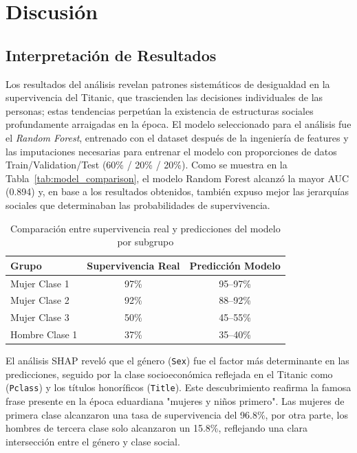 \documentclass[conference]{IEEEtran}
\begin{document}
\section{Discusión}

\subsection{Interpretación de Resultados}

Los resultados del análisis revelan patrones sistemáticos de desigualdad en la supervivencia del Titanic, que trascienden las decisiones individuales de las personas; estas tendencias perpetúan la existencia de estructuras sociales profundamente arraigadas en la época.\cite{hall1986social} El modelo seleccionado para el análisis fue el  \emph{Random Forest}, entrenado con el dataset después de la ingeniería de features y las imputaciones necesarias para entrenar el modelo con proporciones de datos Train/Validation/Test (60\% / 20\% / 20\%). Como se muestra en la Tabla~\ref{tab:model_comparison}, el modelo Random Forest alcanzó la mayor AUC (0.894) y, en base a los resultados obtenidos, también expuso mejor las jerarquías sociales que determinaban las probabilidades de supervivencia.


\begin{table}[htbp]
\centering
\caption{Comparación entre supervivencia real y predicciones del modelo por subgrupo}
\label{tab:grupo_prediccion}
\begin{tabular}{lcc}
\toprule
\textbf{Grupo} & \textbf{Supervivencia Real} & \textbf{Predicción Modelo} \\
\midrule
Mujer Clase 1   & 97\% & 95--97\% \\
Mujer Clase 2   & 92\% & 88--92\% \\
Mujer Clase 3   & 50\% & 45--55\% \\
Hombre Clase 1  & 37\% & 35--40\% \\
\bottomrule
\end{tabular}
\end{table}


El análisis SHAP reveló que el género (\texttt{Sex}) fue el factor más determinante en las predicciones, seguido por la clase socioeconómica reflejada en el Titanic como (\texttt{Pclass}) y los títulos honoríficos (\texttt{Title}). Este descubrimiento reafirma la famosa frase presente en la época eduardiana "mujeres y niños primero". Las mujeres de primera clase alcanzaron una tasa de supervivencia del 96.8\%, por otra parte, los hombres de tercera clase solo alcanzaron un 15.8\%, reflejando una clara intersección entre el género y clase social. 
\end{document}
